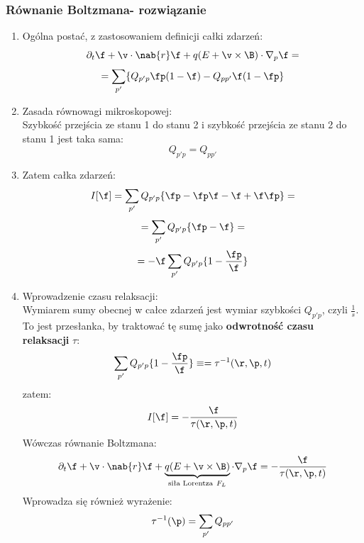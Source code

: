 \subsubsection{Równanie Boltzmana- rozwiązanie}
\begin{enumerate}
\item Ogólna postać, z zastosowaniem definicji całki zdarzeń:
\begin{equation}\partial_t\f+\v\cdot\nab{r}\f+q(E+\v\times\B)\cdot\nabla_p\f=\end{equation}
\begin{equation} =\sum_{p'}\{Q_{p'p}\fp(1-\f)-Q_{pp'}\f(1-\fp\}\nonumber\end{equation}
\item Zasada równowagi mikroskopowej:\\
Szybkość przejścia ze stanu 1 do stanu 2 i szybkość przejścia ze stanu 2 do stanu 1 jest taka sama:
\begin{equation}Q_{p'p}=Q_{pp'}\end{equation}
\item Zatem całka zdarzeń:
\begin{equation}I[\f]=\sum_{p'}Q_{p'p}\{\fp-\fp\f-\f+\f\fp\}=\end{equation}
\begin{equation}=\sum_{p'}Q_{p'p}\{\fp-\f\}=\nonumber\end{equation}
\begin{equation}=-\f\sum_{p'}Q_{p'p}\{1-\frac{\fp}{\f}\}\nonumber\end{equation}
\item Wprowadzenie czasu relaksacji:\\
Wymiarem sumy obecnej w całce zdarzeń jest wymiar szybkości $Q_{p'p}$, czyli $\frac{1}{s}$. To jest przesłanka, by traktować tę sumę jako \textbf{odwrotność czasu relaksacji} $\tau$:
\begin{equation}\sum_{p'}Q_{p'p}\{1-\frac{\fp}{\f}\}\equiv=\tau^{-1}(\r,\p,t)\end{equation}
zatem: 
\begin{equation}I[\f]=-\frac{\f}{\tau(\r,\p,t)}\end{equation}
Wówczas równanie Boltzmana:
\begin{equation}\partial_t\f+\v\cdot\nab{r}\f+\underbrace{q(E+\v\times\B)}_{\text{siła Lorentza}~F_L}\cdot\nabla_p\f=-\frac{\f}{\tau(\r,\p,t)}\end{equation}
Wprowadza się również wyrażenie:
\begin{equation}\tau^{-1}(\p)=\sum_{p'}Q_{pp'}\end{equation}

\end{enumerate}
